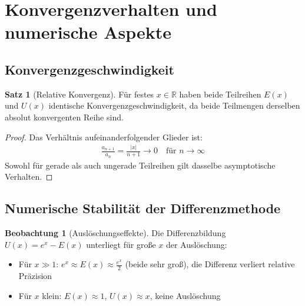 ﻿\documentclass[a4paper,12pt]{article}
\theoremstyle{definition}
\newtheorem{satz}{Satz}
\newtheorem{beobachtung}{Beobachtung}
\begin{document}
\section{Konvergenzverhalten und numerische Aspekte}

\subsection{Konvergenzgeschwindigkeit}

\begin{satz}[Relative Konvergenz]
Für festes $x \in \mathbb{R}$ haben beide Teilreihen $E(x)$ und $U(x)$
identische Konvergenzgeschwindigkeit, da beide Teilmengen derselben absolut
konvergenten Reihe sind.
\end{satz}

\begin{proof}
Das Verhältnis aufeinanderfolgender Glieder ist:
\begin{align}
  \frac{a_{n+1}}{a_n} = \frac{|x|}{n+1} \to 0 \quad \text{für } n \to \infty
\end{align}
Sowohl für gerade als auch ungerade Teilreihen gilt dasselbe asymptotische
Verhalten.
\end{proof}

\subsection{Numerische Stabilität der Differenzmethode}

\begin{beobachtung}[Auslöschungseffekte]
Die Differenzbildung $U(x) = e^x - E(x)$ unterliegt für große $x$ der
Auslöschung:
\begin{itemize}
  \item[-] Für $x \gg 1$: $e^x \approx E(x) \approx \frac{e^x}{2}$
           (beide sehr groß), die Differenz verliert relative Präzision
  \item[-] Für $x$ klein: $E(x) \approx 1$, $U(x) \approx x$,
           keine Auslöschung
\end{itemize}
\end{beobachtung}
\end{document}
